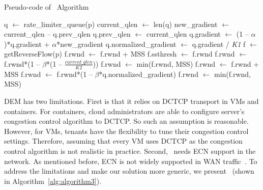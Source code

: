 \begin{algorithm}[t]
\caption{Pseudo-code of~\spring{} Algorithm}
\label{alg:algorithm3}
\begin{algorithmic}[1]
\STATE q $\leftarrow$ rate\_limiter\_queue(p)
\STATE current\_qlen $\leftarrow$ len(q)
\STATE new\_gradient $\leftarrow$ current\_qlen -- q.prev\_qlen
\STATE q.prev\_qlen $\leftarrow$ current\_qlen
\STATE q.gradient $\leftarrow$ (1 -- $\alpha$)*q.gradient + $\alpha$*new\_gradient
\STATE q.normalized\_gradient $\leftarrow$ q.gradient / {\emph {K1}}
\STATE f $\leftarrow$ getReverseFlow(p)
\STATE f.rwnd $\leftarrow$ f.rwnd + MSS
\STATE f.ssthresh $\leftarrow$ f.rwnd
\STATE f.rwnd $\leftarrow$ f.rwnd*(1 -- $\beta$*(1 -- $\frac{current\_qlen}{K2}$))
\STATE f.rwnd $\leftarrow$ min(f.rwnd, MSS)
\STATE f.rwnd $\leftarrow$ f.rwnd + MSS
\ELSE
\STATE f.rwnd $\leftarrow$ f.rwnd*(1 -- $\beta$*q.normalized\_gradient)
\STATE f.rwnd $\leftarrow$ min(f.rwnd, MSS)
\ENDIF
\ENDIF
\ENDFOR
\end{algorithmic}
\end{algorithm}

DEM has two limitations. First is that it relies on 
DCTCP transport in VMs and containers. For containers, cloud administrators are able to configure
server's congestion control algorithm to DCTCP. So such an assumption is reasonable. 
However, for VMs, tenants have the flexibility to tune their congestion control settings.
Therefore, assuming that every VM uses DCTCP as the congestion control algorithm is not realistic in practice.
Second,~\dem{} needs ECN support in the network. As mentioned before, 
ECN is not widely supported in WAN traffic~\cite{kuhlewind2013state}.
To address the limitations and make our solution more generic, we present~\spring{} (shown in Algorithm~\ref{alg:algorithm3}).

